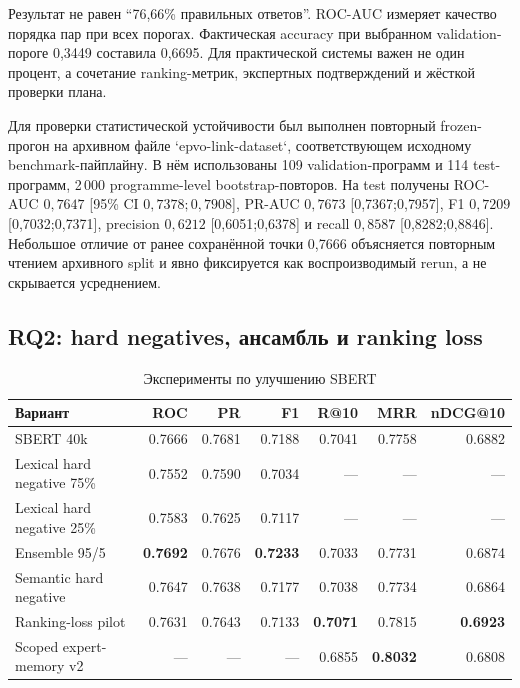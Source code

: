 \documentclass[twoside,11pt]{article}
\begin{document}
Результат не равен ``76,66\% правильных ответов''. ROC-AUC измеряет качество порядка пар при всех порогах. Фактическая accuracy при выбранном validation-пороге 0,3449 составила 0,6695. Для практической системы важен не один процент, а сочетание ranking-метрик, экспертных подтверждений и жёсткой проверки плана.

Для проверки статистической устойчивости был выполнен повторный frozen-прогон на архивном файле `epvo-link-dataset`, соответствующем исходному benchmark-пайплайну. В нём использованы 109 validation-программ и 114 test-программ, 2\,000 programme-level bootstrap-повторов. На test получены ROC-AUC $0{,}7647$ [95\% CI $0{,}7378;0{,}7908$], PR-AUC $0{,}7673$ [0{,}7367;0{,}7957], F1 $0{,}7209$ [0{,}7032;0{,}7371], precision $0{,}6212$ [0{,}6051;0{,}6378] и recall $0{,}8587$ [0{,}8282;0{,}8846]. Небольшое отличие от ранее сохранённой точки 0,7666 объясняется повторным чтением архивного split и явно фиксируется как воспроизводимый rerun, а не скрывается усреднением.

\subsection{RQ2: hard negatives, ансамбль и ranking loss}

\begin{table}[H]
\centering
\caption{Эксперименты по улучшению SBERT}
\label{tab:sbert-ablation}
\small
\begin{tabularx}{\linewidth}{>{\raggedright\arraybackslash}X rrrrrr}
\toprule
\textbf{Вариант} & \textbf{ROC} & \textbf{PR} & \textbf{F1} & \textbf{R@10} & \textbf{MRR} & \textbf{nDCG@10}\\
\midrule
SBERT 40k & 0.7666 & 0.7681 & 0.7188 & 0.7041 & 0.7758 & 0.6882\\
Lexical hard negative 75\% & 0.7552 & 0.7590 & 0.7034 & --- & --- & ---\\
Lexical hard negative 25\% & 0.7583 & 0.7625 & 0.7117 & --- & --- & ---\\
Ensemble 95/5 & \textbf{0.7692} & 0.7676 & \textbf{0.7233} & 0.7033 & 0.7731 & 0.6874\\
Semantic hard negative & 0.7647 & 0.7638 & 0.7177 & 0.7038 & 0.7734 & 0.6864\\
Ranking-loss pilot & 0.7631 & 0.7643 & 0.7133 & \textbf{0.7071} & 0.7815 & \textbf{0.6923}\\
Scoped expert-memory v2 & --- & --- & --- & 0.6855 & \textbf{0.8032} & 0.6808\\
\bottomrule
\end{tabularx}
\end{table}
\end{document}
